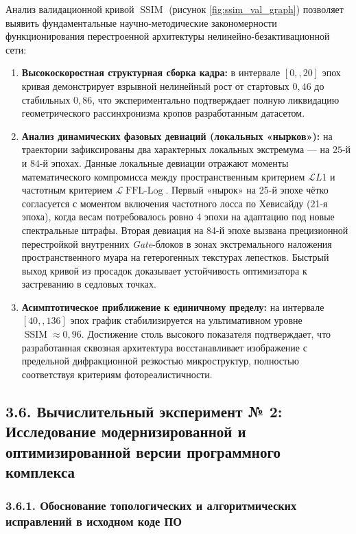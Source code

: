 \documentclass[12pt,a4paper]{article}
\begin{document}
Анализ валидационной кривой $\operatorname{SSIM}$ (рисунок \ref{fig:ssim_val_graph}) позволяет выявить фундаментальные научно-методические закономерности функционирования перестроенной архитектуры нелинейно-безактивационной сети:
\begin{enumerate}
    \item \textbf{Высокоскоростная структурная сборка кадра:} в интервале $[0,, 20]$ эпох кривая демонстрирует взрывной нелинейный рост от стартовых $0{,}46$ до стабильных $0{,}86$, что экспериментально подтверждает полную ликвидацию геометрического рассинхронизма кропов разработанным датасетом.\item \textbf{Анализ динамических фазовых девиаций (локальных «нырков»):} на траектории зафиксированы два характерных локальных экстремума --- на $25$-й и $84$-й эпохах. Данные локальные девиации отражают моменты математического компромисса между пространственным критерием $\mathcal{L}{L1}$ и частотным критерием $\mathcal{L}{\operatorname{FFL-Log}}$. Первый «нырок» на 25-й эпохе чётко согласуется с моментом включения частотного лосса по Хевисайду (21-я эпоха), когда весам потребовалось ровно 4 эпохи на адаптацию под новые спектральные штрафы. Вторая девиация на 84-й эпохе вызвана прецизионной перестройкой внутренних \textit{Gate}-блоков в зонах экстремального наложения пространственного муара на гетерогенных текстурах лепестков. Быстрый выход кривой из просадок доказывает устойчивость оптимизатора к застреванию в седловых точках.\item \textbf{Асимптотическое приближение к единичному пределу:} на интервале $[40,, 136]$ эпох график стабилизируется на ультимативном уровне $\operatorname{SSIM} \approx 0{,}96$. Достижение столь высокого показателя подтверждает, что разработанная сквозная архитектура восстанавливает изображение с предельной дифракционной резкостью микроструктур, полностью соответствуя критериям фотореалистичности.
\end{enumerate}

\subsection{3.6. Вычислительный эксперимент № 2: Исследование модернизированной и оптимизированной версии программного комплекса}

\subsubsection{3.6.1. Обоснование топологических и алгоритмических исправлений в исходном коде ПО}
\end{document}
